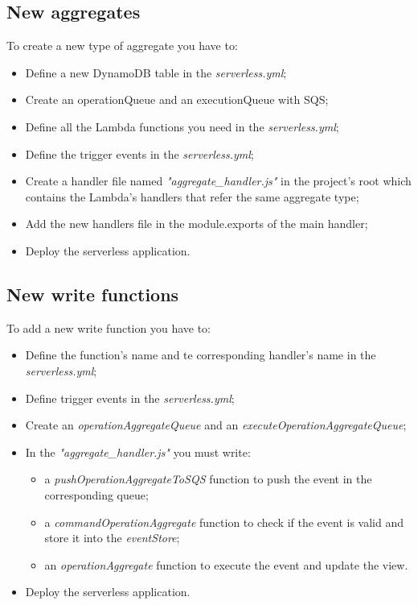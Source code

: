 \newpage
{}
\subsection{New aggregates}
To create a new type of aggregate you have to:
\begin{itemize}
	\item Define a new DynamoDB table in the \emph{serverless.yml};
	\item Create an operationQueue and an executionQueue with SQS;
	\item Define all the Lambda functions you need in the \emph{serverless.yml};
	\item Define the trigger events in the \emph{serverless.yml};
	\item Create a handler file named \emph{"aggregate\_handler.js"} in the project's root which contains the Lambda's handlers that refer the same aggregate type;
	\item Add the new handlers file in the module.exports of the main handler;
	\item Deploy the serverless application.
\end{itemize}

\subsection{New write functions}
To add a new write function you have to:
\begin{itemize}
	\item Define the function's name and te corresponding handler's name in the \emph{serverless.yml};
	\item Define trigger events in the \emph{serverless.yml};
	\item Create an \emph{operationAggregateQueue} and an \emph{executeOperationAggregateQueue}; 
	\item In the \emph{"aggregate\_handler.js"} you must write:
	\begin{itemize}
		\item a \emph{pushOperationAggregateToSQS} function to push the event in the corresponding queue;
		\item a \emph{commandOperationAggregate} function to check if the event is valid and store it into the \emph{eventStore};
		\item an \emph{operationAggregate} function to execute the event and update the view.
	\end{itemize}
	\item Deploy the serverless application.
\end{itemize}

